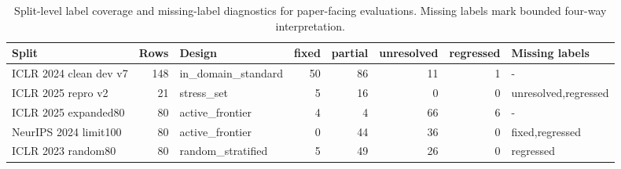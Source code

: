 \begin{table}[t]
\centering
\scriptsize
\setlength{\tabcolsep}{3pt}
\begin{tabular}{p{}r p{}rrrr p{}}
\toprule
Split & Rows & Design & fixed & partial & unresolved & regressed & Missing labels \\
\midrule
ICLR 2024 clean dev v7 & 148 & in\_domain\_standard & 50 & 86 & 11 & 1 & - \\
ICLR 2025 repro v2 & 21 & stress\_set & 5 & 16 & 0 & 0 & unresolved,regressed \\
ICLR 2025 expanded80 & 80 & active\_frontier & 4 & 4 & 66 & 6 & - \\
NeurIPS 2024 limit100 & 80 & active\_frontier & 0 & 44 & 36 & 0 & fixed,regressed \\
ICLR 2023 random80 & 80 & random\_stratified & 5 & 49 & 26 & 0 & regressed \\
\bottomrule
\end{tabular}
\caption{Split-level label coverage and missing-label diagnostics for paper-facing evaluations. Missing labels mark bounded four-way interpretation.}
\label{tab:split-label-coverage}
\end{table}
